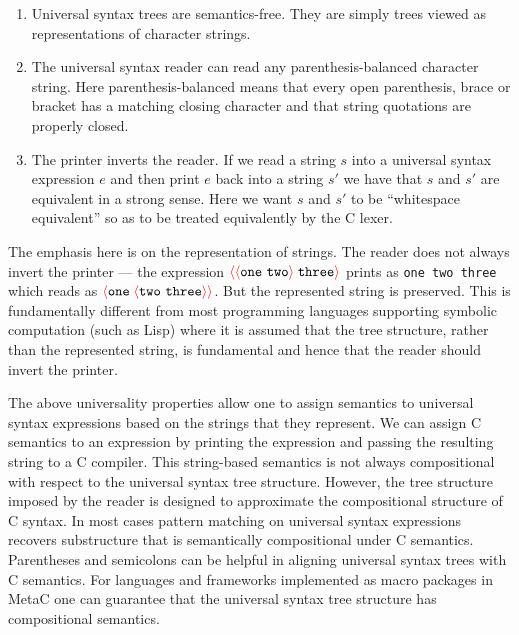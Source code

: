\documentclass{article}
\newcommand{\fopen}{{\color{red} \langle}}
\newcommand{\fclose}{{\color{red} \rangle}}
\begin{document}
\begin{enumerate}
\item Universal syntax trees are semantics-free.  They are simply trees viewed as representations of character strings.

\item The universal syntax reader can read any parenthesis-balanced character string.
  Here parenthesis-balanced means that every open parenthesis, brace or bracket has a matching closing character and that string quotations
  are properly closed.
  
\item The printer inverts the reader. If we read a string $s$ into a universal syntax expression
  $e$ and then print $e$ back into a string $s'$ we have that $s$ and $s'$ are equivalent in a strong sense.  Here we want
  $s$ and $s'$ to be ``whitespace equivalent'' so as to be treated equivalently by the C lexer.
\end{enumerate}

The emphasis here is on the representation of strings.  The reader does not always invert the printer ---
the expression $\fopen \fopen \mathtt{one~two} \fclose \;\mathtt{three}\fclose$ prints as {\tt one two three} which reads as
$\fopen \mathtt{one}\; \fopen \mathtt{two~three} \fclose \fclose$.  But the represented string is preserved.  This is fundamentally different from
most programming languages supporting symbolic computation (such as Lisp) where it is assumed that the tree structure, rather than the represented string, is fundamental
and hence that the reader should invert the printer.

The above universality properties allow one to assign semantics to universal syntax expressions based on the strings that they represent.  We can assign C
semantics to an expression by printing the expression and passing the resulting string to a C compiler.  This string-based semantics is not always
compositional with respect to the universal syntax tree structure.  However, the tree structure imposed by the reader is designed to approximate the
compositional structure of C syntax.  In most cases pattern matching on universal syntax expressions recovers substructure that is semantically compositional under C
semantics. Parentheses and semicolons can be helpful in aligning universal syntax trees with C semantics.
For languages and frameworks implemented as macro packages in MetaC one can guarantee that the universal syntax tree structure
has compositional semantics.
\end{document}
